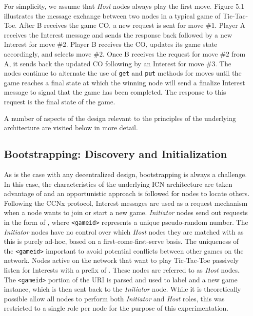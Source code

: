 \documentclass[a4paper,12pt]{report}      %
\begin{document}
For simplicity, we assume that \emph{Host} nodes always play the first move. Figure 5.1 illustrates
the message exchange between two nodes in a typical game of Tic-Tac-Toe. After B receives the game CO, a
new request is sent for move \#1. Player A receives the Interest message and sends the response back
followed by a new Interest for move \#2. Player B receives the CO, updates its game state accordingly,
and selects move \#2. Once B receives the request for move \#2 from A, it sends back the updated CO following by an 
Interest for move \#3. The nodes continue to alternate the use of \verb!get! and \verb!put! methods for moves until
 the game reaches a final state at which the winning node will send a finalize Interest message to signal
 that the game has been completed. The response to this request is the final state of the game.

A number of aspects of the design relevant to the principles of the underlying architecture are visited below in more detail.

\subsection{Bootstrapping: Discovery and Initialization}

As is the case with any decentralized design, bootstrapping is always a challenge. In this case, the
characteristics of the underlying ICN architecture are taken advantage of and an opportunistic approach
is followed for nodes to locate others. Following the CCNx protocol, Interest messages are used as a
request mechanism when a node wants to join or start a new game. \emph{Initiator} nodes send out requests in
the form of \texttt{}, where \texttt{<gameid>} represents a 
unique pseudo-random number. The \emph{Initiator} nodes have no control over which \emph{Host} nodes they are 
matched with as this is purely ad-hoc, based on a first-come-first-serve basis. The uniqueness of the \texttt{<gameid>}
 important to avoid potential conflicts between other games on the network. Nodes active on the network that want to
 play Tic-Tac-Toe passively listen for Interests with a prefix of \texttt{}. These nodes are referred to as \emph{Host} nodes. The \verb!<gameid>! portion of the URI is parsed and used to label and a new game instance, which is
then sent back to the \emph{Initiator} node. While it is theoretically possible allow 
all nodes to perform both \emph{Initiator} and \emph{Host} roles, this was restricted to a single role per node for
the purpose of this experimentation.
\end{document}
